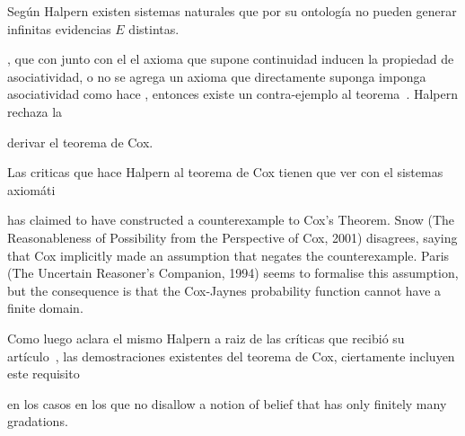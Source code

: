 \documentclass[a4paper,10pt]{book}
\begin{document}
Según Halpern existen sistemas naturales que por su ontología no pueden generar infinitas evidencias $E$ distintas.




, que con junto con el el axioma que supone continuidad inducen la propiedad de asociatividad, o no se agrega un axioma que directamente suponga imponga asociatividad como hace \cite{cox1946}, entonces existe un contra-ejemplo al teorema~\cite{halpern1999-counterExampleCoxTheorem}.
Halpern rechaza la 

derivar el teorema de Cox.




Las criticas que hace Halpern al teorema de Cox tienen que ver con el sistemas axiomáti


has claimed to have constructed a counterexample to Cox's Theorem. Snow (The Reasonableness of Possibility from the Perspective of Cox, 2001) disagrees, saying that Cox implicitly made an assumption that negates the counterexample. Paris (The Uncertain Reasoner's Companion, 1994) seems to formalise this assumption, but the consequence is that the Cox-Jaynes probability function cannot have a finite domain.


Como luego aclara el mismo Halpern a raiz de las críticas que recibió su artículo~\cite{halpern1999-coxTheoremRevisited}, las demostraciones existentes del teorema de Cox,  ciertamente incluyen este requisito 

en los casos en los que no 
disallow a notion of belief that has
only finitely many gradations.






\
\end{document}
